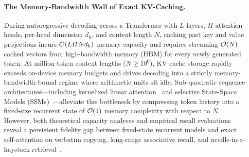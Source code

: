 \paragraph{The Memory-Bandwidth Wall of Exact KV-Caching.}
During autoregressive decoding across a Transformer with $L$ layers, $H$ attention heads, per-head dimension $d_h$, and context length $N$, caching past key and value projections incurs $\mathcal{O}\!\left(L H N d_h\right)$ memory capacity and requires streaming $\mathcal{O}\!\left(N\right)$ cached vectors from high-bandwidth memory (HBM) for every newly generated token.
At million-token context lengths ($N \ge 10^6$), KV-cache storage rapidly exceeds on-device memory budgets and drives decoding into a strictly memory-bandwidth-bound regime where arithmetic units sit idle.
Sub-quadratic sequence architectures---including kernelized linear attention~\cite{KATHAROPOULOS_2020_LINEAR_TRANSFORMER} and selective State-Space Models (SSMs)~\cite{GU_SSM_S4_MAMBA}---alleviate this bottleneck by compressing token history into a fixed-size recurrent state of $\mathcal{O}\!\left(1\right)$ memory complexity with respect to $N$.
However, both theoretical capacity analyses and empirical recall evaluations reveal a persistent fidelity gap between fixed-state recurrent models and exact self-attention on verbatim copying, long-range associative recall, and needle-in-a-haystack retrieval~\cite{JELASSI_2024_REPEAT_AFTER_ME,ARORA_2023_ZOOLOGY}.

